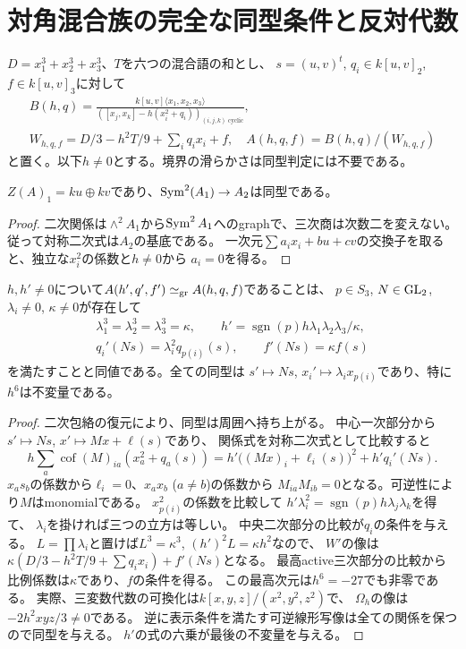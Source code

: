 \section{対角混合族の完全な同型条件と反対代数}
\label{sec:pair-diagonal-classification}
$D=x_1^3+x_2^3+x_3^3$、$T$を六つの混合語の和とし、
$s=(u,v)^t$, $q_i\in k[u,v]_2$, $f\in k[u,v]_3$に対して
\begin{gather*}
 B(h,q)=\frac{k[u,v]\langle x_1,x_2,x_3\rangle}
 {([x_j,x_k]-h(x_i^2+q_i))_{(i,j,k)\text{ cyclic}}},\\
 W_{h,q,f}=D/3-h^2T/9+\sum_iq_ix_i+f,
 \quad A(h,q,f)=B(h,q)/(W_{h,q,f})
\end{gather*}
と置く。以下$h\ne0$とする。境界の滑らかさは同型判定には不要である。

\begin{lemma}
$Z(A)_1=ku\oplus kv$であり、$\operatorname{Sym}^2(A_1)\to A_2$は同型である。
\end{lemma}
\begin{proof}
二次関係は$\wedge^2A_1$から$\operatorname{Sym}^2A_1$へのgraphで、三次商は次数二を変えない。
従って対称二次式は$A_2$の基底である。
一次元$\sum a_ix_i+bu+cv$の交換子を取ると、独立な$x_i^2$の係数と$h\ne0$から
$a_i=0$を得る。
\end{proof}
\begin{theorem}[対角族の同型の必要十分条件]
\label{thm:pair-diagonal-isomorphism}
$h,h'\ne0$について$A(h',q',f')\simeq_{\operatorname{gr}} A(h,q,f)$であることは、
$p\in S_3$, $N\in\mathrm{GL}_2$, $\lambda_i\ne0$, $\kappa\ne0$が存在して
\begin{gather*}
 \lambda_1^3=\lambda_2^3=\lambda_3^3=\kappa,\qquad
 h'=\operatorname{sgn}(p)h\lambda_1\lambda_2\lambda_3/\kappa,\\
 q_i'(Ns)=\lambda_i^2q_{p(i)}(s),\qquad f'(Ns)=\kappa f(s)
\end{gather*}
を満たすことと同値である。全ての同型は
$s'\mapsto Ns$, $x_i'\mapsto\lambda_i x_{p(i)}$であり、特に$h^6$は不変量である。
\end{theorem}
\begin{proof}
二次包絡の復元により、同型は周囲へ持ち上がる。
中心一次部分から$s'\mapsto Ns$, $x'\mapsto Mx+\ell(s)$であり、
関係式を対称二次式として比較すると
\[
 h\sum_a\operatorname{cof}(M)_{ia}(x_a^2+q_a(s))
 =h'\bigl((Mx)_i+\ell_i(s)\bigr)^2+h'q_i'(Ns).
\]
$x_as_b$の係数から$\ell_i=0$、$x_ax_b$ ($a\ne b$)の係数から
$M_{ia}M_{ib}=0$となる。可逆性により$M$はmonomialである。
$x_{p(i)}^2$の係数を比較して
$h'\lambda_i^2=\operatorname{sgn}(p)h\lambda_j\lambda_k$を得て、
$\lambda_i$を掛ければ三つの立方は等しい。
中央二次部分の比較が$q_i$の条件を与える。
$L=\prod\lambda_i$と置けば$L^3=\kappa^3$, $(h')^2L=\kappa h^2$なので、
$W'$の像は$\kappa(D/3-h^2T/9+\sum q_ix_i)+f'(Ns)$となる。
最高active三次部分の比較から比例係数は$\kappa$であり、$f$の条件を得る。
この最高次元は$h^6=-27$でも非零である。
実際、三変数代数の可換化は$k[x,y,z]/(x^2,y^2,z^2)$で、
$\Omega_h$の像は$-2h^2xyz/3\ne0$である。
逆に表示条件を満たす可逆線形写像は全ての関係を保つので同型を与える。
$h'$の式の六乗が最後の不変量を与える。
\end{proof}

